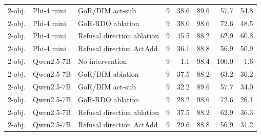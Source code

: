 \begin{table}[H]
{\begin{tabular}{lllrrrrr}
2-obj. & Phi-4 mini & GoR/DIM act-sub & 9 & 38.6 & 89.6 & 57.7 & 54.8 \\
2-obj. & Phi-4 mini & GoR-RDO ablation & 9 & 38.0 & 98.6 & 72.6 & 48.5 \\
2-obj. & Phi-4 mini & Refusal direction ablation & 9 & 45.5 & 88.2 & 62.9 & 60.8 \\
2-obj. & Phi-4 mini & Refusal direction ActAdd & 9 & 36.1 & 88.8 & 56.9 & 50.9 \\
2-obj. & Qwen2.5-7B & No intervention & 9 & 1.1 & 98.4 & 100.0 & 1.6 \\
2-obj. & Qwen2.5-7B & GoR/DIM ablation & 9 & 37.5 & 88.2 & 63.2 & 36.2 \\
2-obj. & Qwen2.5-7B & GoR/DIM act-sub & 9 & 32.2 & 89.6 & 57.7 & 34.0 \\
2-obj. & Qwen2.5-7B & GoR-RDO ablation & 9 & 28.2 & 98.6 & 72.6 & 26.1 \\
2-obj. & Qwen2.5-7B & Refusal direction ablation & 9 & 37.5 & 88.2 & 62.9 & 36.3 \\
2-obj. & Qwen2.5-7B & Refusal direction ActAdd & 9 & 29.6 & 88.8 & 56.9 & 31.2 \\
\bottomrule
\end{tabular}}
\end{table}
